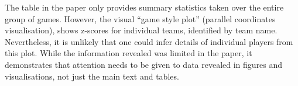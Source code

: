 The table in the paper only provides summary statistics taken over the entire group of games. However, the visual ``game style plot'' (parallel coordinates visualisation), shows z-scores for individual teams, identified by team name. Nevertheless, it is unlikely that one could infer details of individual players from this plot. While the information revealed was limited in the paper, it demonstrates that attention needs to be given to data revealed in figures and visualisations, not just the main text and tables.






%


